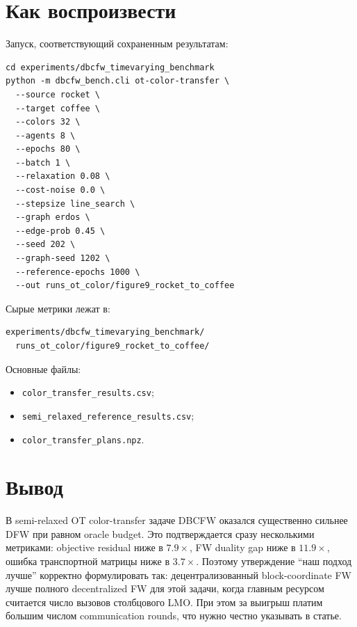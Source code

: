 \documentclass[11pt,a4paper]{article}
\newcommand{\1}{\mathbf{1}}
\begin{document}
\section{Как воспроизвести}

Запуск, соответствующий сохраненным результатам:
\begin{verbatim}
cd experiments/dbcfw_timevarying_benchmark
python -m dbcfw_bench.cli ot-color-transfer \
  --source rocket \
  --target coffee \
  --colors 32 \
  --agents 8 \
  --epochs 80 \
  --batch 1 \
  --relaxation 0.08 \
  --cost-noise 0.0 \
  --stepsize line_search \
  --graph erdos \
  --edge-prob 0.45 \
  --seed 202 \
  --graph-seed 1202 \
  --reference-epochs 1000 \
  --out runs_ot_color/figure9_rocket_to_coffee
\end{verbatim}

Сырые метрики лежат в:
\begin{verbatim}
experiments/dbcfw_timevarying_benchmark/
  runs_ot_color/figure9_rocket_to_coffee/
\end{verbatim}
Основные файлы:
\begin{itemize}
  \item \texttt{color\_transfer\_results.csv};
  \item \texttt{semi\_relaxed\_reference\_results.csv};
  \item \texttt{color\_transfer\_plans.npz}.
\end{itemize}

\section{Вывод}

В semi-relaxed OT color-transfer задаче DBCFW оказался существенно сильнее DFW при равном oracle budget. Это подтверждается сразу несколькими метриками: objective residual ниже в $7.9\times$, FW duality gap ниже в $11.9\times$, ошибка транспортной матрицы ниже в $3.7\times$. Поэтому утверждение ``наш подход лучше'' корректно формулировать так: децентрализованный block-coordinate FW лучше полного decentralized FW для этой задачи, когда главным ресурсом считается число вызовов столбцового LMO. При этом за выигрыш платим большим числом communication rounds, что нужно честно указывать в статье.



\end{document}
